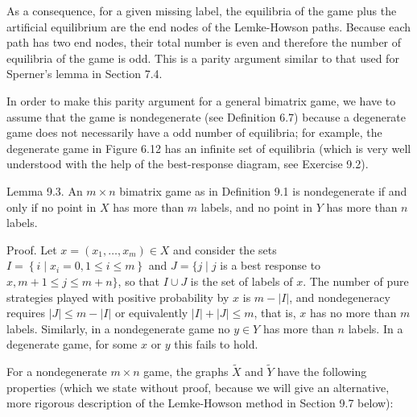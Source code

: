 \documentclass[12pt]{article}
\begin{document}
As a consequence, for a given missing label, the equilibria of the game plus the artificial equilibrium are the end nodes of the Lemke-Howson paths. Because each path has two end nodes, their total number is even and therefore the number of equilibria of the game is odd. This is a parity argument similar to that used for Sperner's lemma in Section 7.4.

In order to make this parity argument for a general bimatrix game, we have to assume that the game is nondegenerate (see Definition 6.7) because a degenerate\\
game does not necessarily have a odd number of equilibria; for example, the degenerate game in Figure 6.12 has an infinite set of equilibria (which is very well understood with the help of the best-response diagram, see Exercise 9.2).

Lemma 9.3. An $m \times n$ bimatrix game as in Definition 9.1 is nondegenerate if and only if no point in $X$ has more than $m$ labels, and no point in $Y$ has more than $n$ labels.

Proof. Let $x=\left(x_{1}, \ldots, x_{m}\right) \in X$ and consider the sets $I=\left\{i \mid x_{i}=0,1 \leq i \leq m\right\}$ and $J=\{j \mid j$ is a best response to $x, m+1 \leq j \leq m+n\}$, so that $I \cup J$ is the set of labels of $x$. The number of pure strategies played with positive probability by $x$ is $m-|I|$, and nondegeneracy requires $|J| \leq m-|I|$ or equivalently $|I|+|J| \leq m$, that is, $x$ has no more than $m$ labels. Similarly, in a nondegenerate game no $y \in Y$ has more than $n$ labels. In a degenerate game, for some $x$ or $y$ this fails to hold.

For a nondegenerate $m \times n$ game, the graphs $\tilde{X}$ and $\tilde{Y}$ have the following properties (which we state without proof, because we will give an alternative, more rigorous description of the Lemke-Howson method in Section 9.7 below):
\end{document}
